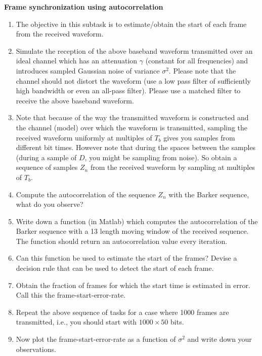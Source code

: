 \myhrule
\noindent
\textbf{Frame synchronization using autocorrelation}
\begin{enumerate}
\item The objective in this subtask is to estimate/obtain the start of each frame from the received waveform.
\item Simulate the reception of the above baseband waveform transmitted over an ideal channel which has an attenuation $\gamma$ (constant for all frequencies) and introduces sampled Gaussian noise of variance $\sigma^{2}$. Please note that the channel should not distort the waveform (use a low pass filter of sufficiently high bandwidth or even an all-pass filter). Please use a matched filter to receive the above baseband waveform.
\item Note that because of the way the transmitted waveform is constructed and the channel (model) over which the waveform is transmitted, sampling the received waveform uniformly at multiples of $T_{b}$ gives you samples from different bit times. However note that during the spaces between the samples (during a sample of $D$, you might be sampling from noise). So obtain a sequence of samples $Z_{n}$ from the received waveform by sampling at multiples of $T_{b}$.
\item Compute the autocorrelation of the sequence $Z_{n}$ with the Barker sequence, what do you observe?
\item Write down a function (in Matlab) which computes the autocorrelation of the Barker sequence with a 13 length moving window of the received sequence. The function should return an autocorrelation value every iteration.
\item Can this function be used to estimate the start of the frames? Devise a decision rule that can be used to detect the start of each frame.
\item Obtain the fraction of frames for which the start time is estimated in error. Call this the frame-start-error-rate.
\item Repeat the above sequence of tasks for a case where 1000 frames are transmitted, i.e., you should start with $1000 \times 50$ bits.
\item Now plot the frame-start-error-rate as a function of $\sigma^{2}$ and write down your observations.
\end{enumerate}

